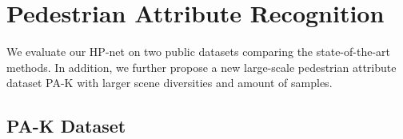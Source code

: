\documentclass[10pt,twocolumn,letterpaper]{article}
\begin{document}
\section{Pedestrian Attribute Recognition}
\label{sec:exp_attribute}

We evaluate our HP-net on two public datasets comparing the state-of-the-art methods. In addition, we further propose a new large-scale pedestrian attribute dataset PA-K with larger scene diversities and amount of samples.



\subsection{PA-K Dataset}
\label{sub:pa_100k_datasets}
\end{document}
